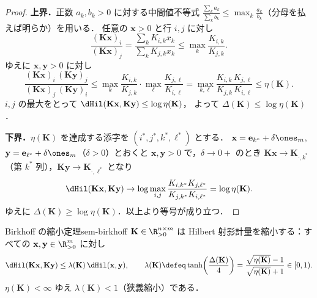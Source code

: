 \begin{proof}
  \textbf{上界．}正数 $a_k, b_k > 0$ に対する中間値不等式
  $\frac{\sum_k a_k}{\sum_k b_k} \leq \max_k \frac{a_k}{b_k}$（分母を払えば明らか）を用いる．
  任意の $\mathbf{x} > 0$ と行 $i, j$ に対し
  \[
    \frac{(\mathbf{K}\mathbf{x})_i}{(\mathbf{K}\mathbf{x})_j}
    = \frac{\sum_k K_{i,k} x_k}{\sum_k K_{j,k} x_k}
    \leq \max_k \frac{K_{i,k}}{K_{j,k}}.
  \]
  ゆえに $\mathbf{x}, \mathbf{y} > 0$ に対し
  \[
    \frac{(\mathbf{K}\mathbf{x})_i\,(\mathbf{K}\mathbf{y})_j}{(\mathbf{K}\mathbf{x})_j\,(\mathbf{K}\mathbf{y})_i}
    \leq \max_k \frac{K_{i,k}}{K_{j,k}} \cdot \max_\ell \frac{K_{j,\ell}}{K_{i,\ell}}
    = \max_{k,\ell} \frac{K_{i,k}\,K_{j,\ell}}{K_{j,k}\,K_{i,\ell}}
    \leq \eta(\mathbf{K}).
  \]
  $i, j$ の最大をとって $\dHil(\mathbf{K}\mathbf{x}, \mathbf{K}\mathbf{y}) \leq \log\eta(\mathbf{K})$，
  よって $\Delta(\mathbf{K}) \leq \log\eta(\mathbf{K})$．

  \textbf{下界．}$\eta(\mathbf{K})$ を達成する添字を $(i^*, j^*, k^*, \ell^*)$ とする．
  $\mathbf{x} = \mathbf{e}_{k^*} + \delta\ones_m$, $\mathbf{y} = \mathbf{e}_{\ell^*} + \delta\ones_m$（$\delta > 0$）とおくと
  $\mathbf{x}, \mathbf{y} > 0$ で，$\delta \to 0+$ のとき
  $\mathbf{K}\mathbf{x} \to \mathbf{K}_{\cdot,k^*}$（第 $k^*$ 列），$\mathbf{K}\mathbf{y} \to \mathbf{K}_{\cdot,\ell^*}$ となり
  \[
    \dHil(\mathbf{K}\mathbf{x}, \mathbf{K}\mathbf{y})
    \to \log\max_{i,j}\frac{K_{i,k^*}K_{j,\ell^*}}{K_{j,k^*}K_{i,\ell^*}}
    = \log\eta(\mathbf{K}).
  \]
  ゆえに $\Delta(\mathbf{K}) \geq \log\eta(\mathbf{K})$．以上より等号が成り立つ．
\end{proof}

\begin{theorem}{Birkhoff の縮小定理}{sem-birkhoff}
  $\mathbf{K} \in \R_{>0}^{n\times m}$ は Hilbert 射影計量を縮小する：すべての
  $\mathbf{x}, \mathbf{y} \in \R_{>0}^m$ に対し
  \[
    \dHil(\mathbf{K}\mathbf{x}, \mathbf{K}\mathbf{y})
    \leq \lambda(\mathbf{K})\, \dHil(\mathbf{x}, \mathbf{y}),
    \qquad
    \lambda(\mathbf{K})
    \defeq \tanh\!\left(\frac{\Delta(\mathbf{K})}{4}\right)
    = \frac{\sqrt{\eta(\mathbf{K})} - 1}{\sqrt{\eta(\mathbf{K})} + 1} \in [0, 1).
  \]
  $\eta(\mathbf{K}) < \infty$ ゆえ $\lambda(\mathbf{K}) < 1$（狭義縮小）である．
\end{theorem}

